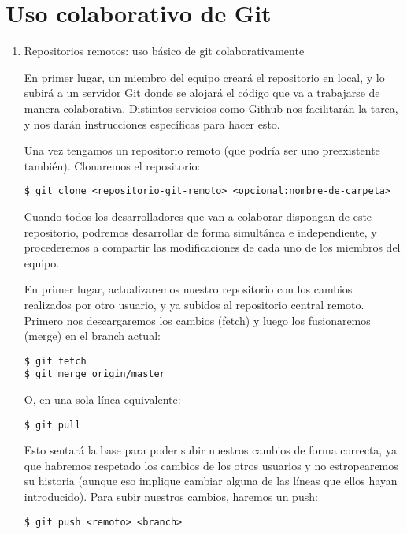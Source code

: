 \documentclass[a4paper,oneside]{article}
\begin{document}
\section{Uso colaborativo de Git}

\begin{enumerate}
  \item Repositorios remotos: uso básico de git colaborativamente

En primer lugar, un miembro del equipo creará el repositorio en local, y lo subirá a un servidor Git donde se alojará el código que va a trabajarse de manera colaborativa. Distintos servicios como Github nos facilitarán la tarea, y nos darán instrucciones específicas para hacer esto.

Una vez tengamos un repositorio remoto (que podría ser uno preexistente también). Clonaremos el repositorio:

    \begin{verbatim}
$ git clone <repositorio-git-remoto> <opcional:nombre-de-carpeta>
    \end{verbatim}

Cuando todos los desarrolladores que van a colaborar dispongan de este repositorio, podremos desarrollar de forma simultánea e independiente, y procederemos a compartir las modificaciones de cada uno de los miembros del equipo.

En primer lugar, actualizaremos nuestro repositorio con los cambios realizados por otro usuario, y ya subidos al repositorio central remoto. Primero nos descargaremos los cambios (fetch) y luego los fusionaremos (merge) en el branch actual:

    \begin{verbatim}
$ git fetch
$ git merge origin/master
    \end{verbatim}

O, en una sola línea equivalente:

    \begin{verbatim}
$ git pull
    \end{verbatim}

Esto sentará la base para poder subir nuestros cambios de forma correcta, ya que habremos respetado los cambios de los otros usuarios y no estropearemos su historia (aunque eso implique cambiar alguna de las líneas que ellos hayan introducido). Para subir nuestros cambios, haremos un push:

    \begin{verbatim}
$ git push <remoto> <branch>
    \end{verbatim}


\end{enumerate}
\end{document}
